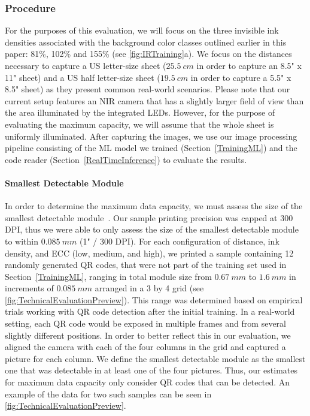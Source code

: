 \subsubsection{Procedure}
For the purposes of this evaluation, we will focus on the three invisible ink densities associated with the background color classes outlined earlier in this paper: 81\%, 102\% and 155\% (see \autoref{fig:IRTraining}a).
We focus on the distances necessary to capture a US letter-size sheet ($25.5~cm$ in order to capture an 8.5" x 11" sheet) and a US half letter-size sheet ($19.5~cm$ in order to capture a 5.5" x 8.5" sheet) as they present common real-world scenarios.
Please note that our current setup features an NIR camera that has a slightly larger field of view than the area illuminated by the integrated LEDs. However, for the purpose of evaluating the maximum capacity, we will assume that the whole sheet is uniformly illuminated.
After capturing the images, we use our image processing pipeline consisting of the ML model we trained (Section~\ref{TrainingML}) and the code reader (Section~\ref{RealTimeInference}) to evaluate the results.





\paragraph{Smallest Detectable Module}
In order to determine the maximum data capacity, we must assess the size of the smallest detectable module~\cite{dogan_standarone_2023}. Our sample printing precision was capped at 300 DPI, thus we were able to only assess the size of the smallest detectable module to within $0.085~mm$ (1" / 300 DPI). For each configuration of distance, ink density, and ECC (low, medium, and high), we printed a sample containing 12 randomly generated QR codes, that were not part of the training set used in Section~\ref{TrainingML}, ranging in total module size from $0.67~mm$ to $1.6~mm$ in increments of $0.085~mm$ arranged in a 3 by 4 grid (see \autoref{fig:TechnicalEvaluationPreview}). This range was determined based on empirical trials working with QR code detection after the initial training. In a real-world setting, each QR code would be exposed in multiple frames and from several slightly different positions.
In order to better reflect this in our evaluation, we aligned the camera with each of the four columns in the grid and captured a picture for each column.
We define the smallest detectable module as the smallest one that was detectable in at least one of the four pictures. Thus, our estimates for maximum data capacity only consider QR codes that can be detected. An example of the data for two such samples can be seen in \autoref{fig:TechnicalEvaluationPreview}.


